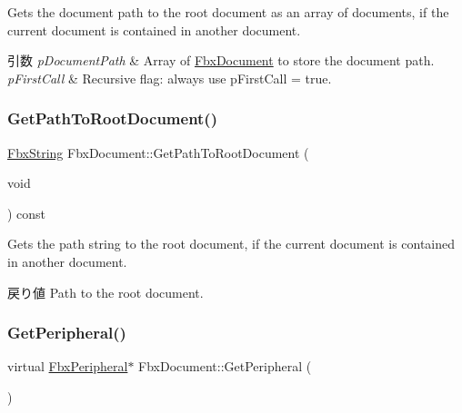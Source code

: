 Gets the document path to the root document as an array of documents, if the current document is contained in another document. 
\begin{DoxyParams}{引数}
{\em p\+Document\+Path} & Array of \hyperlink{class_fbx_document}{Fbx\+Document} to store the document path. \\
\hline
{\em p\+First\+Call} & Recursive flag\+: always use p\+First\+Call = {\ttfamily true}. \\
\hline
\end{DoxyParams}
\mbox{\label{class_fbx_document_a77e3aa2196782836cd7db1f817f9a352}} 
\subsubsection{\texorpdfstring{Get\+Path\+To\+Root\+Document()}{GetPathToRootDocument()}}
{\footnotesize\ttfamily \hyperlink{class_fbx_string}{Fbx\+String} Fbx\+Document\+::\+Get\+Path\+To\+Root\+Document (\begin{DoxyParamCaption}\item[{void}]{ }\end{DoxyParamCaption}) const}

Gets the path string to the root document, if the current document is contained in another document. \begin{DoxyReturn}{戻り値}
Path to the root document. 
\end{DoxyReturn}
\mbox{\label{class_fbx_document_a83abd11e3c318ab4f20a23282626bb7d}} 
\subsubsection{\texorpdfstring{Get\+Peripheral()}{GetPeripheral()}}
{\footnotesize\ttfamily virtual \hyperlink{class_fbx_peripheral}{Fbx\+Peripheral}$\ast$ Fbx\+Document\+::\+Get\+Peripheral (\begin{DoxyParamCaption}{ }\end{DoxyParamCaption})\hspace{0.3cm}{\ttfamily [virtual]}}

